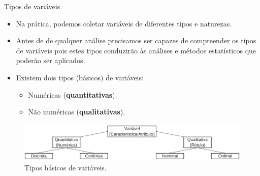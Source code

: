 \documentclass[
  ignorenonframetext,
  serif,
  professionalfont,
  usenames,
  dvipsnames,
  aspectratio = 169]{beamer}
\providecommand{\tightlist}{%
  \setlength{\itemsep}{0pt}\setlength{\parskip}{0pt}}
\renewcommand{\tightlist}{%
  \setlength{\itemsep}{0\baselineskip}
  \setlength{\parskip}{0.25\baselineskip}
}
\begin{document}
\begin{frame}{Tipos de variáveis}
\label{tipos-de-variuxe1veis-1}
\vspace{0.3cm}

\begin{itemize}
\item
  Na prática, podemos coletar variáveis de diferentes tipos e naturezas.
\item
  Antes de de qualquer análise precisamos ser capazes de compreender os
  tipos de variáveis pois estes tipos conduzirão às análises e métodos
  estatísticos que poderão ser aplicados.
\end{itemize}

\vspace{0.3cm}

\begin{itemize}
\tightlist
\item
  Existem dois tipos (básicos) de variáveis:

  \begin{itemize}
  \tightlist
  \item
    Numéricas (\textbf{quantitativas}).
  \item
    Não numéricas (\textbf{qualitativas}).
  \end{itemize}
\end{itemize}

\vspace{0.3cm}

\begin{figure}

{\centering \includegraphics[width=0.9\linewidth]{./img/tipos-variaveis2} 

}

\caption{Tipos básicos de variáveis.}\label{fig:unnamed-chunk-27}
\end{figure}
\end{frame}
\end{document}
